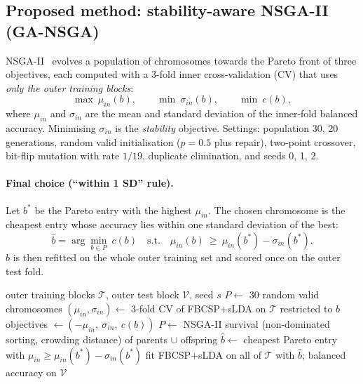 \documentclass[11pt,a4paper]{article}
\newcommand{\ga}{GA-NSGA}
\begin{document}
\subsection{Proposed method: stability-aware NSGA-II (\ga)}
NSGA-II~\cite{deb2002,pymoo} evolves a population of chromosomes towards the Pareto front of three
objectives, each computed with a 3-fold inner cross-validation (CV) that uses \emph{only the outer
training blocks}:
\begin{equation}
  \max\ \mu_{in}(b),\qquad \min\ \sigma_{in}(b),\qquad \min\ c(b),
\end{equation}
where $\mu_{in}$ and $\sigma_{in}$ are the mean and standard deviation of the inner-fold balanced
accuracy. Minimising $\sigma_{in}$ is the \emph{stability} objective. Settings: population 30,
20 generations, random valid initialisation ($p=0.5$ plus repair), two-point crossover, bit-flip
mutation with rate $1/19$, duplicate elimination, and seeds 0, 1, 2.

\paragraph{Final choice (``within 1 SD'' rule).} Let $b^\ast$ be the Pareto entry with the highest
$\mu_{in}$. The chosen chromosome is the cheapest entry whose accuracy lies within one standard
deviation of the best:
\begin{equation}
  \hat b=\arg\min_{b\in P}\ c(b)\quad\text{s.t.}\quad \mu_{in}(b)\ \ge\ \mu_{in}(b^\ast)-\sigma_{in}(b^\ast).
\end{equation}
$\hat b$ is then refitted on the whole outer training set and scored once on the outer test fold.

\begin{algorithm}[H]
\caption{Nested evaluation of the stability-aware GA for one outer fold}
\begin{algorithmic}[1]
\Require outer training blocks $\mathcal{T}$, outer test block $\mathcal{V}$, seed $s$
\State $P \gets$ 30 random valid chromosomes
    \State $(\mu_{in},\sigma_{in}) \gets$ 3-fold CV of FBCSP+sLDA on $\mathcal{T}$ restricted to $b$
    \State objectives $\gets(-\mu_{in},\ \sigma_{in},\ c(b))$
  \EndFor
  \State $P\gets$ NSGA-II survival (non-dominated sorting, crowding distance) of parents $\cup$ offspring
\EndFor
\State $\hat b\gets$ cheapest Pareto entry with $\mu_{in}\ge\mu_{in}(b^\ast)-\sigma_{in}(b^\ast)$
\State fit FBCSP+sLDA on all of $\mathcal{T}$ with $\hat b$; \Return balanced accuracy on $\mathcal{V}$
\end{algorithmic}
\end{algorithm}
\end{document}

